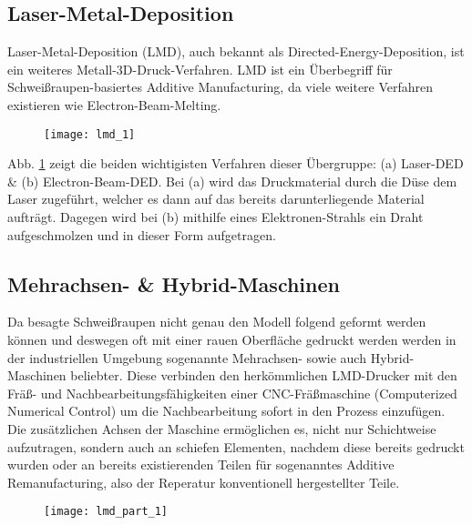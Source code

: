 \documentclass[../main.tex]{subfiles}
\begin{document}
\subsection{Laser-Metal-Deposition}
Laser-Metal-Deposition (LMD), auch bekannt als Directed-Energy-Deposition, ist ein weiteres Metall-3D-Druck-Verfahren. LMD ist ein Überbegriff für Schweißraupen-basiertes Additive Manufacturing, da viele weitere Verfahren existieren wie Electron-Beam-Melting.
\begin{figure}[h!]
	\begin{center}

		\texttt{[image: lmd\_1]}
\label{img:lmd_1}	
	\end{center}
\end{figure}
Abb. \ref{img:lmd_1} zeigt die beiden wichtigisten Verfahren dieser Übergruppe: (a) Laser-DED \& (b) Electron-Beam-DED.
Bei (a) wird das Druckmaterial durch die Düse dem Laser zugeführt, welcher es dann auf das bereits darunterliegende Material aufträgt. 
Dagegen wird bei (b) mithilfe eines Elektronen-Strahls ein Draht aufgeschmolzen und in dieser Form aufgetragen. \parencite{ALL3D_1}
\subsection{Mehrachsen- \& Hybrid-Maschinen}

Da besagte Schweißraupen nicht genau den Modell folgend geformt werden können und deswegen oft mit einer rauen Oberfläche gedruckt werden werden in der industriellen Umgebung sogenannte Mehrachsen- sowie auch Hybrid-Maschinen beliebter. Diese verbinden den herkömmlichen LMD-Drucker mit den Fräß- und Nachbearbeitungsfähigkeiten einer CNC-Fräßmaschine (Computerized Numerical Control) um die Nachbearbeitung sofort in den Prozess einzufügen.
Die zusätzlichen Achsen der Maschine ermöglichen es, nicht nur Schichtweise aufzutragen, sondern auch an schiefen Elementen, nachdem diese bereits gedruckt wurden oder an bereits existierenden Teilen für sogenanntes Additive Remanufacturing, also der Reperatur konventionell hergestellter Teile. \parencite{ALL3D_2}
\begin{figure}[h!]
	\begin{center}
	\texttt{[image: lmd\_part\_1]}	
		\label{img:lmd_part_1}
	\end{center}
	
\end{figure}
\end{document}
